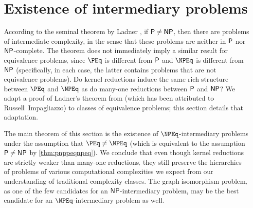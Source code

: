 \newcommand{\floor}[1]{\lfloor #1 \rfloor}
\section{Existence of intermediary problems}
\label{sec:intermediary}
%
According to the seminal theorem by Ladner \autocite{ladner75}, if $\P \neq \NP$, then there are problems of intermediate complexity, in the sense that these problems are neither in $\P$ nor $\NP$-complete.
The theorem does not immediately imply a similar result for equivalence problems, since $\PEq$ is different from $\P$ and $\NPEq$ is different from $\NP$ (specifically, in each case, the latter contains problems that are not equivalence problems).
Do kernel reductions induce the same rich structure between $\PEq$ and $\NPEq$ as do many-one reductions between $\P$ and $\NP$?
We adapt a proof of Ladner's theorem from \autocite{df03} (which has been attributed to Russell~Impagliazzo) to classes of equivalence problems;
this section details that adaptation.

%
The main theorem of this section is the existence of $\NPEq$-intermediary problems under the assumption that $\PEq \neq \NPEq$ (which is equivalent to the assumption $\P \neq \NP$ by \autoref{thm:pnppeqnpeq}).
We conclude that even though kernel reductions are strictly weaker than many-one reductions, they still preserve the hierarchies of problems of various computational complexities we expect from our understanding of traditional complexity classes.
The graph isomorphism problem, as one of the few candidates for an $\NP$-intermediary problem, may be the best candidate for an $\NPEq$-intermediary problem as well.

